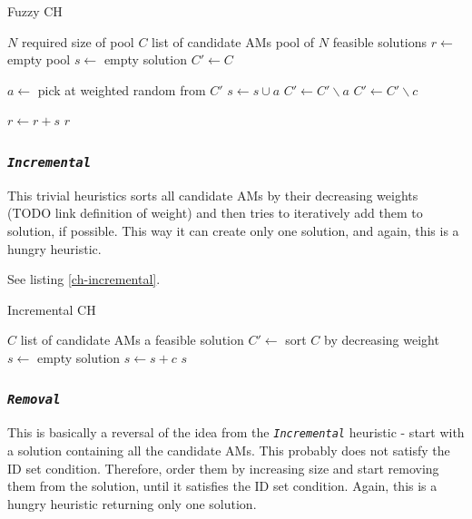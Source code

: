 \documentclass[a4paper,12pt,oneside]{report}
\newcommand{\jmodule}[1]{\texttt{\textit{#1}}}
\theoremstyle{definition}
\begin{document}
\begin{algorithm}
\caption{Fuzzy CH}
\label{ch-fuzzy}
\begin{algorithmic}
\REQUIRE $N$ required size of pool
\REQUIRE $C$ list of candidate AMs
\ENSURE pool of $N$ feasible solutions
\STATE $r \gets $ empty pool
  \STATE {}
  \STATE $s \gets $ empty solution
  \STATE $C' \gets C$

    \STATE $a \gets $ pick at weighted random from $C'$
      \STATE $s \gets s \cup a$
      \STATE $C' \gets C' \backslash a$
    \ENDIF
        \STATE {}
        \STATE $C' \gets C' \backslash c$
      \ENDIF
    \ENDFOR
  \ENDWHILE

  \STATE $r \gets r + s$
\ENDFOR
\RETURN $r$
\end{algorithmic}
\end{algorithm}

\subsubsection{\jmodule{Incremental}}

This trivial heuristics sorts all candidate AMs by their decreasing weights (TODO link definition of weight) and then tries to iteratively add them to solution, if possible. This way it can create only one solution, and again, this is a hungry heuristic.

See listing \ref{ch-incremental}.

\begin{algorithm}
\caption{Incremental CH}
\label{ch-incremental}
\begin{algorithmic}
\REQUIRE $C$ list of candidate AMs
\ENSURE a feasible solution
\STATE $C' \gets $ sort $C$ by decreasing weight
\STATE $s \gets $ empty solution
    \STATE $s \gets s + c$
  \ENDIF
\ENDFOR
\RETURN $s$
\end{algorithmic}
\end{algorithm}

\subsubsection{\jmodule{Removal}}

This is basically a reversal of the idea from the \jmodule{Incremental} heuristic - start with a solution containing all the candidate AMs. This probably does not satisfy the ID set condition. Therefore, order them by increasing size and start removing them from the solution, until it satisfies the ID set condition. Again, this is a hungry heuristic returning only one solution.
\end{document}
